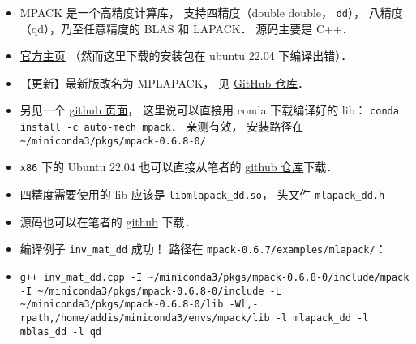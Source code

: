 
\begin{issues}
\issueDraft
\end{issues}

\begin{itemize}
\item MPACK 是一个高精度计算库， 支持四精度（double double， \verb|dd|）， 八精度（qd），乃至任意精度的 BLAS 和 LAPACK． 源码主要是 C++．
\item \href{https://mplapack.sourceforge.net/}{官方主页} （然而这里下载的安装包在 ubuntu 22.04 下编译出错）．
\item 【更新】最新版改名为 MPLAPACK， 见 \href{https://github.com/nakatamaho/mplapack}{GitHub 仓库}．
\item 另见一个 \href{https://github.com/Auto-Mech/MPACK}{github 页面}， 这里说可以直接用 conda 下载编译好的 lib： \verb|conda install -c auto-mech mpack|． 亲测有效， 安装路径在 \verb|~/miniconda3/pkgs/mpack-0.6.8-0/|
\item \verb|x86| 下的 Ubuntu 22.04 也可以直接从笔者的 \href{https://github.com/MacroUniverse/MPACK-source}{github 仓库}下载．
\item 四精度需要使用的 lib 应该是 \verb|libmlapack_dd.so|， 头文件 \verb|mlapack_dd.h|
\item 源码也可以在笔者的 \href{https://github.com/MacroUniverse/MPACK-source}{github} 下载．
\item 编译例子 \verb|inv_mat_dd| 成功！ 路径在 \verb|mpack-0.6.7/examples/mlapack/|：
\item \verb|g++ inv_mat_dd.cpp -I ~/miniconda3/pkgs/mpack-0.6.8-0/include/mpack -I ~/miniconda3/pkgs/mpack-0.6.8-0/include -L ~/miniconda3/pkgs/mpack-0.6.8-0/lib -Wl,-rpath,/home/addis/miniconda3/envs/mpack/lib -l mlapack_dd -l mblas_dd -l qd|
\end{itemize}

